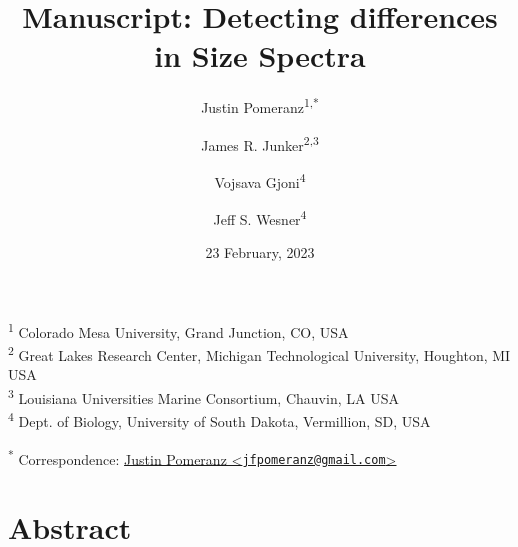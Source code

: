 \documentclass[
]{article}
\title{Manuscript: Detecting differences in Size Spectra}
\author{Justin Pomeranz\textsuperscript{1,*} \and James R.
Junker\textsuperscript{2,3} \and Vojsava
Gjoni\textsuperscript{4} \and Jeff S. Wesner\textsuperscript{4}}
\date{23 February, 2023}
\begin{document}
\maketitle

{
\setcounter{tocdepth}{2}
\tableofcontents
}
\textsuperscript{1} Colorado Mesa University, Grand Junction, CO, USA\\
\textsuperscript{2} Great Lakes Research Center, Michigan Technological
University, Houghton, MI USA\\
\textsuperscript{3} Louisiana Universities Marine Consortium, Chauvin,
LA USA\\
\textsuperscript{4} Dept. of Biology, University of South Dakota,
Vermillion, SD, USA

\textsuperscript{*} Correspondence:
\href{mailto:jfpomeranz@gmail.com}{Justin Pomeranz
\textless{}\href{mailto:jfpomeranz@gmail.com}{\nolinkurl{jfpomeranz@gmail.com}}\textgreater{}}

\hypertarget{abstract}{%
\section{Abstract}\label{abstract}}
\end{document}
